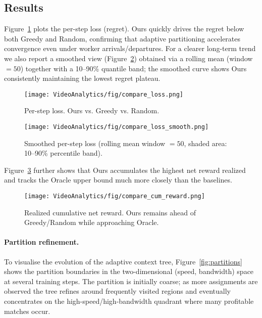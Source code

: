 \subsection{Results}

Figure~\ref{fig:loss} plots the per-step loss (regret). Ours quickly drives the regret below both Greedy and Random, confirming that adaptive partitioning accelerates convergence even under worker arrivals/departures. For a clearer long-term trend we also report a smoothed view (Figure~\ref{fig:loss_smooth}) obtained via a rolling mean (window $=50$) together with a 10--90\% quantile band; the smoothed curve shows Ours consistently maintaining the lowest regret plateau.

\begin{figure}[t]
\centering
\texttt{[image: VideoAnalytics/fig/compare\_loss.png]}
\caption{Per-step loss. Ours vs. Greedy vs. Random.}
\label{fig:loss}
\end{figure}

\begin{figure}[t]
\centering
\texttt{[image: VideoAnalytics/fig/compare\_loss\_smooth.png]}
\caption{Smoothed per-step loss (rolling mean window $=50$, shaded area: 10--90\% percentile band).}
\label{fig:loss_smooth}
\end{figure}

Figure~\ref{fig:cum} further shows that Ours accumulates the highest net reward realized and tracks the Oracle upper bound much more closely than the baselines.

\begin{figure}[t]
\centering
\texttt{[image: VideoAnalytics/fig/compare\_cum\_reward.png]}
\caption{Realized cumulative net reward. Ours remains ahead of Greedy/Random while approaching Oracle.}
\label{fig:cum}
\end{figure}

\paragraph{Partition refinement.} To visualise the evolution of the adaptive context tree, Figure~\ref{fig:partitions} shows the partition boundaries in the two-dimensional (speed, bandwidth) space at several training steps. The partition is initially coarse; as more assignments are observed the tree refines around frequently visited regions and eventually concentrates on the high-speed/high-bandwidth quadrant where many profitable matches occur.

